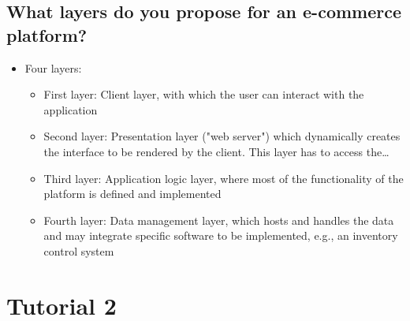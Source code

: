 \documentclass{article}
\begin{document}
\subsection{What layers do you propose for an e-commerce platform?}
\begin{itemize}
    \item Four layers:
          \begin{itemize}
              \item First layer: Client layer, with which the user can interact with the application
              \item Second layer: Presentation layer ("web server") which dynamically creates the interface to be rendered by the client. This layer has to access the\dots
              \item Third layer: Application logic layer, where most of the functionality of the platform is defined and implemented
              \item Fourth layer: Data management layer, which hosts and handles the data and may integrate specific software to be implemented, e.g., an inventory control system
          \end{itemize}
\end{itemize}

\section{Tutorial 2}
\end{document}
